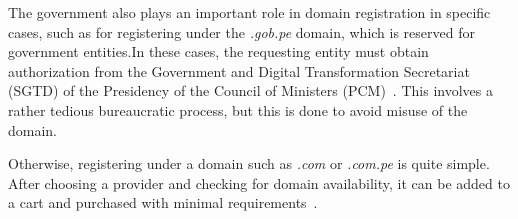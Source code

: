 The government also plays an important role in domain registration in specific
cases, such as for registering under the \textit{.gob.pe} domain, which is
reserved for government entities.In these cases, the requesting entity must
obtain authorization from the Government and Digital Transformation Secretariat
(SGTD) of the Presidency of the Council of Ministers
(PCM)~\cite{gobpe:dominio}. This involves a rather tedious bureaucratic
process, but this is done to avoid misuse of the domain.

Otherwise, registering under a domain such as \textit{.com} or \textit{.com.pe}
is quite simple. After choosing a provider and checking for domain
availability, it can be added to a cart and purchased with minimal
requirements~\cite{godaddy:peru}.